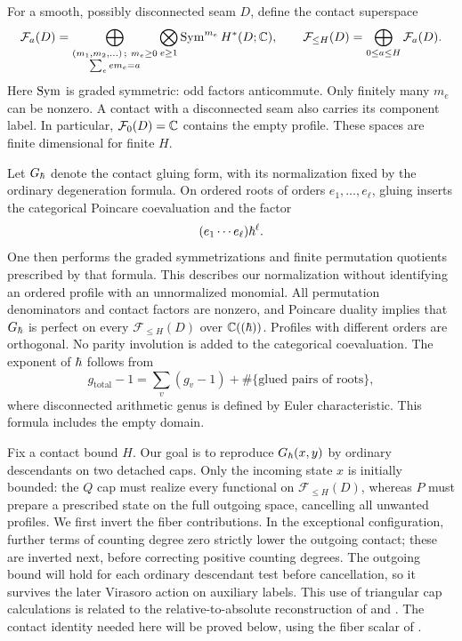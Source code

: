 For a smooth, possibly disconnected seam $D$, define the contact superspace
\begin{equation}\label{cap:states}
 \mathcal F_a(D)=
 \bigoplus_{\substack{(m_1,m_2,\ldots)\,;\ m_e\geq0\\
                     \sum_e e m_e=a}}
       \bigotimes_{e\geq1}\operatorname{Sym}^{m_e}H^*(D;\mathbb C),
 \qquad
 \mathcal F_{\leq H}(D)=\bigoplus_{0\leq a\leq H}\mathcal F_a(D).
\end{equation}
Here $\operatorname{Sym}$ is graded symmetric: odd factors anticommute.  Only finitely
many $m_e$ can be nonzero.  A contact with a disconnected seam also carries
its component label.  In particular, $\mathcal F_0(D)=\mathbb C$ contains the
empty profile.  These spaces are finite dimensional for finite $H$.

Let $G_{\hbar}$ denote the contact gluing form, with its normalization fixed
by the ordinary degeneration formula.  On ordered roots of orders
$e_1,\ldots,e_\ell$, gluing inserts the categorical Poincare coevaluation
and the factor
\[
        (e_1\cdots e_\ell)\hbar^\ell.
\]
One then performs the graded symmetrizations and finite permutation
quotients prescribed by that formula.  This describes our normalization
without identifying an ordered profile with an unnormalized monomial.
All permutation denominators and contact factors are nonzero, and
Poincare duality implies that $G_{\hbar}$ is perfect on every
$\mathcal F_{\leq H}(D)$ over $\mathbb C((\hbar))$.  Profiles with different orders
are orthogonal.  No parity involution is added to the categorical
coevaluation.  The exponent of $\hbar$ follows from
\[
 g_{\mathrm{total}}-1
    =\sum_v(g_v-1)+\#\{\text{glued pairs of roots}\},
\]
where disconnected arithmetic genus is defined by Euler characteristic.
This formula includes the empty domain.

Fix a contact bound $H$. Our goal is to reproduce $G_{\hbar}(x,y)$ by ordinary
descendants on two detached caps. Only the incoming state $x$ is initially
bounded: the
$Q$ cap must realize every functional on $\mathcal F_{\leq H}(D)$,
whereas $P$ must prepare a prescribed state on the full outgoing space,
cancelling all unwanted profiles. We first invert the fiber contributions.
In the exceptional configuration, further terms of counting degree zero
strictly lower the outgoing contact; these are inverted next, before
correcting positive counting degrees. The outgoing bound will hold for
each ordinary descendant test before cancellation, so it survives the later
Virasoro action on auxiliary labels. This use of triangular cap calculations is related
to the relative-to-absolute reconstruction of
\cite[Theorem~2 and Sections~2.2--2.4]{MaulikPandharipande2006} and
\cite[Theorem~5.15]{HLR2008}. The contact identity needed here will be
proved below, using the fiber scalar of \cite[Theorem~7.1]{HLR2008}.

